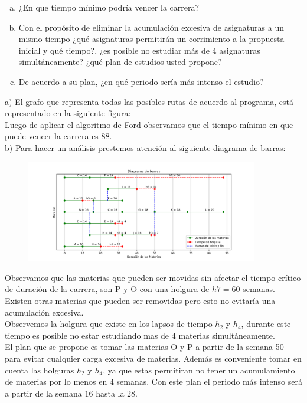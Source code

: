 \documentclass[autocontact]{gaceta}
\begin{document}
        \begin{center}
            \begin{enumerate}[a)]
                \item ¿En que tiempo mínimo podría vencer la carrera?
                \item Con el propósito de eliminar la acumulación excesiva de asignaturas a un mismo 
                tiempo ¿qué asignaturas permitirán un corrimiento a la propuesta inicial y qué tiempo?,
                ¿es posible no estudiar más de 4 asignaturas simultáneamente? ¿qué plan de estudios 
                usted propone?
                \item De acuerdo a su plan, ¿en qué periodo sería más intenso el estudio?
            \end{enumerate}
        \end{center}
        a) El grafo que representa todas las posibles rutas de acuerdo al programa, está representado 
        en la siguiente figura:
        \pagebreak
        \\
        
        Luego de aplicar el algoritmo de Ford observamos que el tiempo mínimo en que puede 
        vencer la carrera es 88.
        \\b) Para hacer un análisis prestemos atención al siguiente diagrama de barras:
        \begin{figure}
            \centering
            \includegraphics[width = 0.9\textwidth]{Figure_1}
            \caption{}
        \end{figure}
        \pagebreak
        Observamos que las materias que pueden ser movidas sin afectar el tiempo crítico 
        de duración de la carrera, son P y O con una holgura de $h7 = 60 $ semanas. Existen otras 
        materias que pueden ser removidas pero esto no evitaría una acumulación excesiva.
        \\Observemos la holgura que existe en los lapsos de tiempo $h_2$ y $h_4$, durante este
        tiempo es posible no estar estudiando mas de 4 materias simultáneamente.
        \\El plan que se propone es tomar las materias O y P a partir de la semana 50 para evitar 
        cualquier carga excesiva de materias. Además es conveniente tomar en cuenta las
        holguras $h_2$ y $h_4$, ya que estas permitiran no tener un acumulamiento de materias 
        por lo menos en 4 semanas. Con este plan el periodo más intenso será a partir de la 
        semana $16$ hasta la $28$.
\end{document}
